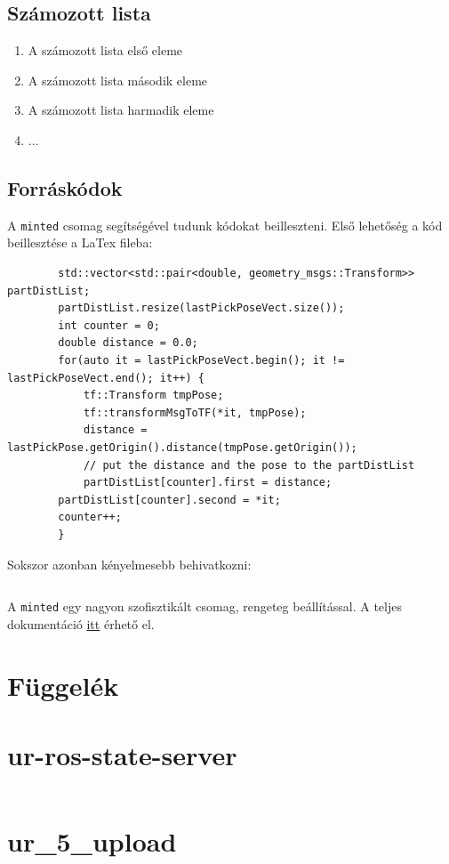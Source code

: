 \documentclass[12pt,a4paper]{article}
\begin{document}
	\subsection{Számozott lista}
		
		\begin{enumerate}
			\item A számozott lista első eleme
			\item A számozott lista második eleme
			\item A számozott lista harmadik eleme
			\item ...
		\end{enumerate}
	
	\subsection{Forráskódok}	
	
	A \verb|minted| csomag segítségével tudunk kódokat beilleszteni. Első lehetőség a kód beillesztése a LaTex fileba: 
	
	\begin{verbatim}
		std::vector<std::pair<double, geometry_msgs::Transform>> partDistList;
		partDistList.resize(lastPickPoseVect.size());
		int counter = 0;
		double distance = 0.0;
		for(auto it = lastPickPoseVect.begin(); it != lastPickPoseVect.end(); it++) {
			tf::Transform tmpPose;
			tf::transformMsgToTF(*it, tmpPose);
			distance = lastPickPose.getOrigin().distance(tmpPose.getOrigin());
			// put the distance and the pose to the partDistList
			partDistList[counter].first = distance;
		partDistList[counter].second = *it;
		counter++;
		}
	\end{verbatim}
	
	Sokszor azonban kényelmesebb behivatkozni:
	
	\inputminted{c++}{code/example.cpp}
	
	A  \verb|minted| egy nagyon szofisztikált csomag, rengeteg beállítással. A teljes dokumentáció \href{https://ctan.org/pkg/minted?lang=en}{itt} érhető el.
	
	
    \makebibliography
	\makefigures
	\maketables
	
	\appendix
	
	\section*{Függelék}
	\begin{appendices}
		\section{ur-ros-state-server} 
		\label{appendix:ur-ros-state-server}
		\inputminted{js}{code/ur5_state_server.js}
		
		\pagebreak
		
		\section{ur\_5\_upload}
		\label{appendix:ur_5_upload}
		\inputminted{xml}{code/ur5_upload.launch}
	\end{appendices}
\end{document}
